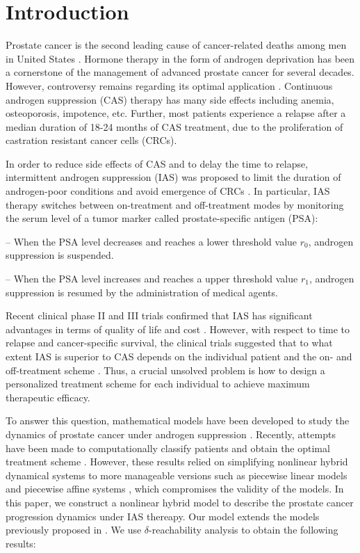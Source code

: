 \section{Introduction}
Prostate cancer is the second leading cause of cancer-related deaths among men in United States \citep{cancerstat}. Hormone therapy in the form of androgen deprivation has been a cornerstone of the management of advanced prostate cancer for several decades. However, controversy remains regarding its optimal application \citep{nru}. Continuous androgen suppression (CAS) therapy has many side effects including anemia, osteoporosis, impotence, etc. Further, most patients experience a relapse after a median duration of 18-24 months of CAS treatment, due to the proliferation of castration resistant cancer cells (CRCs).

In order to reduce side effects of CAS and to delay the time to relapse, intermittent androgen suppression (IAS) was proposed to limit the duration of androgen-poor conditions and avoid emergence of CRCs \citep{bruchovsky95}. In particular, IAS therapy switches between on-treatment and off-treatment modes by monitoring the serum level of a tumor marker called prostate-specific antigen (PSA):

-- When the PSA level decreases and reaches a lower threshold value $r_0$, androgen suppression is suspended.

-- When the PSA level increases and reaches a upper threshold value $r_1$, androgen suppression is resumed by the administration of medical agents.

Recent clinical phase II and III trials confirmed that IAS has significant advantages in terms of quality of life and cost \cite{bruchovsky06,bruchovsky07}. However, with respect to time to relapse and cancer-specific survival, the clinical trials suggested that to what extent IAS is superior to CAS depends on the individual patient and the on- and off-treatment scheme \citep{bruchovsky06,bruchovsky07}. Thus, a crucial unsolved problem is how to design a personalized treatment scheme for each individual to achieve maximum therapeutic efficacy.

To answer this question, mathematical models have been developed to study the dynamics of prostate cancer under androgen suppression \citep{jackson04a,jackson04b,ideta08,hirata10,pnas11,portz12}. Recently, attempts have been made to computationally classify patients and obtain the optimal treatment scheme \citep{chaos10,suzuki10}. However, these results relied on simplifying nonlinear hybrid dynamical systems to more manageable versions such as piecewise linear models \citep{chaos10} and piecewise affine systems \citep{suzuki10}, which compromises the validity of the models. In this paper, we construct a nonlinear hybrid model to describe the prostate cancer progression dynamics under IAS thereapy. Our model extends the models previously proposed in \citep{jackson04a,jackson04b,ideta08}. We use $\delta$-reachability analysis to obtain the following results:

